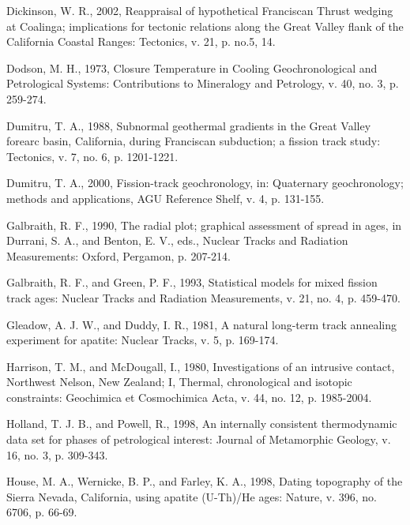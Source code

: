 \documentclass[11pt,twoside]{article}
\begin{document}
\begin{description}
\item Dickinson,  W. R., 2002, Reappraisal  of hypothetical Franciscan
Thrust wedging at Coalinga;  implications for tectonic relations along
the Great  Valley flank of  the California Coastal  Ranges: Tectonics,
v. 21, p. no.5, 14.

\item   Dodson,  M.   H.,   1973,  Closure   Temperature  in   Cooling
Geochronological and Petrological Systems: Contributions to Mineralogy
and Petrology, v. 40, no. 3, p. 259-274.

\item  Dumitru, T.  A., 1988,  Subnormal geothermal  gradients  in the
Great Valley forearc  basin, California, during Franciscan subduction;
a fission track study: Tectonics, v. 7, no. 6, p. 1201-1221.

\item   Dumitru,  T.  A.,   2000,  Fission-track   geochronology,  in:
Quaternary  geochronology;  methods  and applications,  AGU  Reference
Shelf, v. 4, p. 131-155.

\item Galbraith, R. F., 1990, The radial plot; graphical assessment of
spread in  ages, in Durrani, S.  A., and Benton, E.  V., eds., Nuclear
Tracks and Radiation Measurements: Oxford, Pergamon, p. 207-214.

\item Galbraith, R. F., and Green, P. F., 1993, Statistical models for
mixed fission  track ages: Nuclear Tracks  and Radiation Measurements,
v. 21, no. 4, p. 459-470.

\item Gleadow, A.  J. W., and Duddy, I. R.,  1981, A natural long-term
track  annealing  experiment  for   apatite:  Nuclear  Tracks,  v.  5,
p. 169-174.

\item Harrison, T.  M., and McDougall, I., 1980,  Investigations of an
intrusive  contact,   Northwest  Nelson,  New   Zealand;  I,  Thermal,
chronological  and isotopic  constraints:  Geochimica et  Cosmochimica
Acta, v. 44, no. 12, p. 1985-2004.

\item  Holland,  T.  J.  B.,  and  Powell,  R.,  1998,  An  internally
consistent thermodynamic data set for phases of petrological interest:
Journal of Metamorphic Geology, v. 16, no. 3, p. 309-343.

\item House, M.  A., Wernicke, B. P., and Farley,  K. A., 1998, Dating
topography of  the Sierra Nevada, California,  using apatite (U-Th)/He
ages: Nature, v. 396, no. 6706, p. 66-69.


\end{description}
\end{document}
